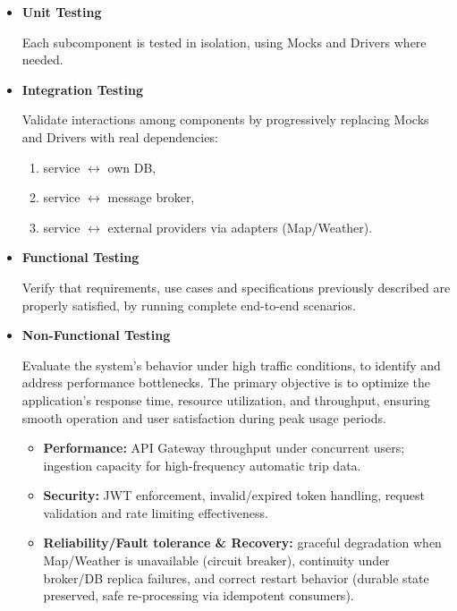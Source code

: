 \begin{itemize}
    \item \textbf{Unit Testing}
    
    Each subcomponent is tested in isolation, using Mocks and Drivers where needed.
    
    \item \textbf{Integration Testing}
    
    Validate interactions among components by progressively replacing Mocks and Drivers with real dependencies:
    \begin{enumerate}
        \item[(i)] service $\leftrightarrow$ own DB,
        \item[(ii)] service $\leftrightarrow$ message broker,
        \item[(iii)] service $\leftrightarrow$ external providers via adapters (Map/Weather).
    \end{enumerate}
    
    \item \textbf{Functional Testing}
    
    Verify that requirements, use cases and specifications previously described are properly satisfied, by running complete end-to-end scenarios.
    
    \item \textbf{Non-Functional Testing}
    
    Evaluate the system's behavior under high traffic conditions, to identify and address performance bottlenecks. The primary objective is to optimize the application's response time, resource utilization, and throughput, ensuring smooth operation and user satisfaction during peak usage periods.
    
    \begin{itemize}
        \item \textbf{Performance:} API Gateway throughput under concurrent users; ingestion capacity for high-frequency automatic trip data.
        \item \textbf{Security:} JWT enforcement, invalid/expired token handling, request validation and rate limiting effectiveness.
        \item \textbf{Reliability/Fault tolerance \& Recovery:} graceful degradation when Map/Weather is unavailable (circuit breaker), continuity under broker/DB replica failures, and correct restart behavior (durable state preserved, safe re-processing via idempotent consumers).
    \end{itemize}
\end{itemize}
